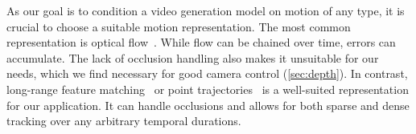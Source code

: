 As our goal is to condition a video generation model on motion of any type, it is crucial to choose a suitable motion representation. 
The most common representation is optical flow~\cite{horn1981determining,lucas1981iterative,brox2010large,dosovitskiy2015flownet,sun2018pwc,teed2020raft}.
While flow can be chained over time, errors can accumulate.
The lack of occlusion handling also makes it unsuitable for our needs, which we find necessary for good camera control (\cref{sec:depth}).
In contrast, long-range feature matching~\cite{jabri2020space,bian2022learning,shrivastava2024selfsupervised,jiang2021cotr} or point trajectories~\cite{harley2022particle,zheng2023point,karaev23cotracker,karaev2024cotracker3,doersch2023tapir,doersch2024bootstap} is a well-suited representation for our application. It can handle occlusions and allows for both sparse and dense tracking over any arbitrary temporal durations. 




